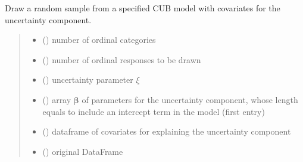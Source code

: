\documentclass[letterpaper,10pt,english]{sphinxmanual}
\begin{document}
\begin{fulllineitems}
\label{\detokenize{cubmods:cubmods.cub_y0.draw}}
\pysigstartsignatures
{}
\pysigstopsignatures
\sphinxAtStartPar
Draw a random sample from a specified CUB model with covariates for
the uncertainty component.
\begin{quote}\begin{description}
\begin{itemize}
\item {} 
\sphinxAtStartPar
{} () \textendash{} number of ordinal categories

\item {} 
\sphinxAtStartPar
{} () \textendash{} number of ordinal responses to be drawn

\item {} 
\sphinxAtStartPar
{} () \textendash{} uncertainty parameter \(\xi\)

\item {} 
\sphinxAtStartPar
{} () \textendash{} array \(\pmb \beta\) of parameters for the uncertainty component, whose length equals 
 to include an intercept term in the model (first entry)

\item {} 
\sphinxAtStartPar
{} () \textendash{} dataframe of covariates for explaining the uncertainty component

\item {} 
\sphinxAtStartPar
{} () \textendash{} original DataFrame


\end{itemize}
\end{description}
\end{quote}
\end{fulllineitems}
\end{document}
